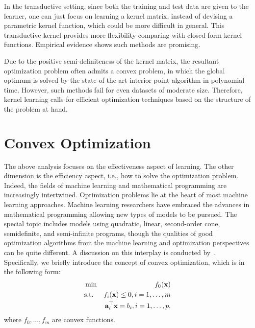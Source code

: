 In the transductive setting, since both the training and test data are given to the learner, one can just focus on learning a kernel matrix, instead of devising a parametric kernel function, which could be more difficult in general. This transductive kernel provides more flexibility comparing with closed-form kernel functions. Empirical evidence shows such methods are promising\cite{icml/HoiJL07}.

Due to the positive semi-definiteness of the kernel matrix, the resultant optimization problem often admits a convex problem, in which the global optimum is solved by the state-of-the-art interior point algorithm in polynomial time\cite{Boyd}. However, such methods fail for even datasets of moderate size. Therefore, kernel learning calls for efficient optimization techniques based on the structure of the problem at hand.


\section{Convex Optimization}

The above analysis focuses on the effectiveness aspect of learning. The other dimension is the efficiency aspect, i.e., how to solve the optimization problem. Indeed, the fields of machine learning and mathematical programming are increasingly intertwined\cite{jmlr/BennettP06}. Optimization problems lie at the heart of most machine learning approaches. Machine learning researchers have embraced the advances in mathematical programming allowing new types of models to be pursued. The special topic includes models using quadratic, linear, second-order cone, semidefinite, and semi-infinite programs, though the qualities of good optimization algorithms from the machine learning and optimization perspectives can be quite different. A discussion on this interplay is conducted by~\cite{jmlr/BennettP06}. Specifically, we briefly introduce the concept of convex optimization, which is in the following form\cite{Boyd}:
\begin{eqnarray}
&\min& f_0(\mathbf{x})\nonumber\\
&\mbox{s.t.}& f_i(\mathbf{x})\leq 0, i=1,\ldots,m\nonumber\\
&& \mathbf a_i^\top \mathbf{x}=b_i, i=1,\ldots,p, \nonumber
\end{eqnarray}
where $f_0,\ldots,f_m$ are convex functions.

